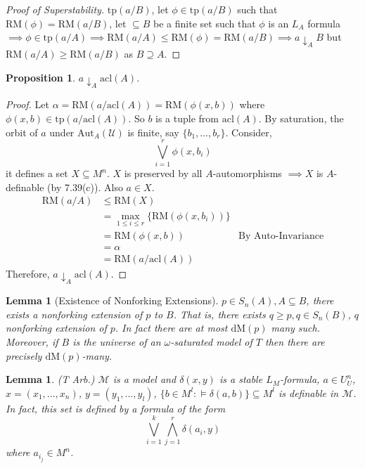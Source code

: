 \documentclass[letterpaper, 12pt]{article}
\newcommand{\cU}{\mathcal{U}}
\newcommand{\cM}{\mathcal{M}}
\newcommand{\Aut}{\mbox{Aut}}
\newcommand{\tp}{\mbox{tp}}
\newcommand{\RM}{\mbox{RM}}
\newcommand{\dM}{\mbox{dM}}
\newcommand{\acl}{\mbox{acl}}
\theoremstyle{stdthm}
\newtheorem{lem}[thm]{Lemma}
\newtheorem{prop}[thm]{Proposition}
\theoremstyle{stddef}
\theoremstyle{stdnonum}
\theoremstyle{stdqands}
\theoremstyle{stdbold}
\begin{document}
\begin{proof}[Proof of Superstability]
$\tp(a/B)$, let $\phi \in \tp(a/B)$ such that $\RM(\phi) = \RM(a/B)$, let $\subseteq B$ be a finite set such that $\phi$ is an $L_A$ formula $\implies \phi \in \tp(a/A) \implies \RM(a/A) \leq \RM(\phi) = \RM(a/B) \implies a \downarrow_A B$ but $\RM(a/A) \geq \RM(a/B)$ as $B \supseteq A$. 
\end{proof}

\begin{prop}
$a \downarrow_A \acl(A)$. 
\end{prop}
\begin{proof}
Let $\alpha = \RM(a/\acl(A)) = \RM(\phi(x,b))$ where $\phi(x,b) \in \tp(a/\acl(A))$. So $b$ is a tuple from $\acl(A)$. By saturation, the orbit of $a$ under $\Aut_A(\cU)$ is finite, say $\{b_1,\dots,b_r\}$. Consider, 
\[ \bigvee_{i=1}^r \phi(x,b_i) \]
it defines a set $X \subseteq M^n$. $X$ is preserved by all $A$-automorphisms $\implies X$ is $A$-definable (by 7.39(c)).  Also $a \in X$. 
\begin{align*}
\RM(a/A) &\leq \RM(X) \\
&= \max_{1\leq i \leq r} \{\RM(\phi(x,b_i))\} \\
&= \RM(\phi(x,b)) & \text{By Auto-Invariance}\\
&= \alpha \\
&= \RM(a/\acl(A))
\end{align*}
Therefore, $a \downarrow_A \acl(A)$. 

\end{proof}


\begin{lem}[Existence of Nonforking Extensions]
$p \in S_n(A), A\subseteq B$, there exists a nonforking extension of $p$ to $B$. That is, there exists $q \geq p, q \in S_n(B)$, $q$ nonforking extension of $p$. In fact there are at most $\dM(p)$ many such. Moreover, if $B$ is the universe of an $\omega$-saturated model of $T$ then there are precisely $\dM(p)$-many.  
\end{lem}






\begin{lem}(T Arb.)
$\cM$ is a model and $\delta(x,y)$ is a stable $L_M$-formula, $a \in U^n_U$, $x = (x_1,\dots,x_n)$, $y=(y_1,\dots,y_l)$, $\{b \in M^l: \models \delta(a,b) \} \subseteq M^l$ is definable in $\cM$. In fact, this set is defined by a formula of the form 
\[ \bigvee_{i=1}^k \bigwedge_{j=1}^r \delta(a_i,y) \]
where $a_{i_j} \in M^n$. 
\end{lem}
\end{document}

